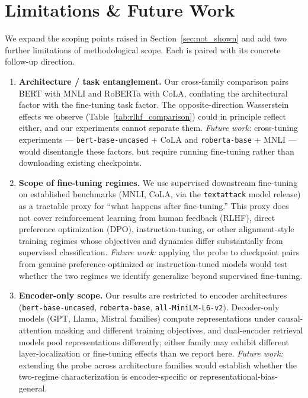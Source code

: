 \documentclass[11pt]{article}
\begin{document}
\section{Limitations \& Future Work}\label{sec:limitations}

We expand the scoping points raised in Section~\ref{sec:not_shown} and add two further limitations of methodological scope. Each is paired with its concrete follow-up direction.

\begin{enumerate}
\item \textbf{Architecture / task entanglement.} Our cross-family comparison pairs BERT with MNLI and RoBERTa with CoLA, conflating the architectural factor with the fine-tuning task factor. The opposite-direction Wasserstein effects we observe (Table~\ref{tab:rlhf_comparison}) could in principle reflect either, and our experiments cannot separate them. \textit{Future work:} cross-tuning experiments --- \texttt{bert-base-uncased} + CoLA and \texttt{roberta-base} + MNLI --- would disentangle these factors, but require running fine-tuning rather than downloading existing checkpoints.

\item \textbf{Scope of fine-tuning regimes.} We use supervised downstream fine-tuning on established benchmarks (MNLI, CoLA, via the \texttt{textattack} model release) as a tractable proxy for ``what happens after fine-tuning.'' This proxy does not cover reinforcement learning from human feedback (RLHF), direct preference optimization (DPO), instruction-tuning, or other alignment-style training regimes whose objectives and dynamics differ substantially from supervised classification. \textit{Future work:} applying the probe to checkpoint pairs from genuine preference-optimized or instruction-tuned models would test whether the two regimes we identify generalize beyond supervised fine-tuning.

\item \textbf{Encoder-only scope.} Our results are restricted to encoder architectures (\texttt{bert-base-uncased}, \texttt{roberta-base}, \texttt{all-MiniLM-L6-v2}). Decoder-only models (GPT, Llama, Mistral families) compute representations under causal-attention masking and different training objectives, and dual-encoder retrieval models pool representations differently; either family may exhibit different layer-localization or fine-tuning effects than we report here. \textit{Future work:} extending the probe across architecture families would establish whether the two-regime characterization is encoder-specific or representational-bias-general.


\end{enumerate}
\end{document}
